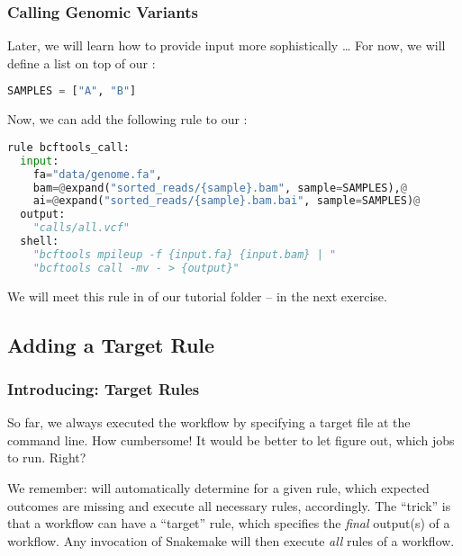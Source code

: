 \begin{frame}[fragile]
  \frametitle{Calling Genomic Variants}
  Later, we will learn how to provide input more sophistically \ldots\newline
  For now, we will define a list on top of our :
  \begin{lstlisting}[language=Python,style=Python]
SAMPLES = ["A", "B"]
  \end{lstlisting}
  Now, we can add the following rule to our :
  \begin{lstlisting}[language=Python,style=Python,basicstyle=\footnotesize]
rule bcftools_call:
  input:
    fa="data/genome.fa",
    bam=@expand("sorted_reads/{sample}.bam", sample=SAMPLES),@
    ai=@expand("sorted_reads/{sample}.bam.bai", sample=SAMPLES)@
  output:
    "calls/all.vcf"
  shell:
    "bcftools mpileup -f {input.fa} {input.bam} | "
    "bcftools call -mv - > {output}"
  \end{lstlisting}
  We will meet this rule in  of our tutorial folder -- in the next exercise.
\end{frame}

\subsection{Adding a Target Rule}

\begin{frame}
	\frametitle{Introducing: Target Rules}
	\begin{question}
	  So far, we always executed the workflow by specifying a target file at the command line. How cumbersome!\newline
	  It would be better to let \Snakemake{} figure out, which jobs to run. Right?
	\end{question}
    \pause
	\begin{docs}
		We remember: \Snakemake{} will automatically determine for a given rule, which expected outcomes are missing and execute all necessary rules, accordingly.\newline\pause
		The ``trick'' is that a workflow can have a ``target'' rule, which specifies the \emph{final} output(s) of a workflow. Any invocation of Snakemake will then execute \emph{all} rules of a workflow.
	\end{docs}
\end{frame}

